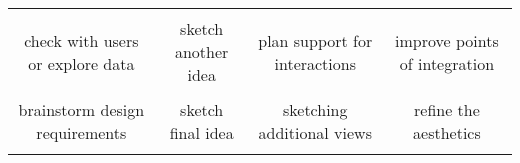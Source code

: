 {\begin{spacing}{1.0}
\begin{longtable}[]{cccc}
\begin{minipage}[t]{0.21\columnwidth}
\end{minipage}\tabularnewline
\begin{minipage}[t]{0.21\columnwidth}\raggedright\strut
check with users or explore data\strut
\end{minipage} & \begin{minipage}[t]{0.21\columnwidth}\raggedright\strut
sketch another idea\strut
\end{minipage} & \begin{minipage}[t]{0.21\columnwidth}\raggedright\strut
plan support for interactions\strut
\end{minipage} & \begin{minipage}[t]{0.21\columnwidth}\raggedright\strut
improve points of integration\strut
\end{minipage}\tabularnewline
\begin{minipage}[t]{0.21\columnwidth}\raggedright\strut
\strut
\end{minipage} & \begin{minipage}[t]{0.21\columnwidth}\raggedright\strut
\strut
\end{minipage} & \begin{minipage}[t]{0.21\columnwidth}\raggedright\strut
\strut
\end{minipage} & \begin{minipage}[t]{0.21\columnwidth}\raggedright\strut
\strut
\end{minipage}\tabularnewline
\begin{minipage}[t]{0.21\columnwidth}\raggedright\strut
brainstorm design requirements\strut
\end{minipage} & \begin{minipage}[t]{0.21\columnwidth}\raggedright\strut
sketch final idea\strut
\end{minipage} & \begin{minipage}[t]{0.21\columnwidth}\raggedright\strut
sketching additional views\strut
\end{minipage} & \begin{minipage}[t]{0.21\columnwidth}\raggedright\strut
refine the aesthetics\strut
\end{minipage}\tabularnewline
\begin{minipage}[t]{0.21\columnwidth}\raggedright\strut
\strut
\end{minipage} & \begin{minipage}[t]{0.21\columnwidth}\raggedright\strut
\strut
\end{minipage} & \begin{minipage}[t]{0.21\columnwidth}\raggedright\strut

\end{minipage}
\end{longtable}
\end{spacing}}

